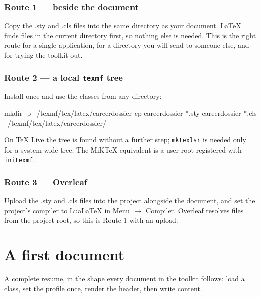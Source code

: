 \documentclass[11pt]{article}
\makeatletter
\newif\ifcd@firstchar
\newcommand{\cd@breaklong}[1]{%
  \cd@firstchartrue
  \@tfor\cd@char:=#1\do{\expandafter\cd@testchar\cd@char}}
\newcommand{\cd@testchar}[1]{%
  \ifcd@firstchar
    \cd@firstcharfalse
  \else
    \ifnum\uccode`#1=`#1 \allowbreak\fi
  \fi
  #1%
  \ifnum0\if#1-1\fi\if#1/1\fi\if#1.1\fi>0 \allowbreak\fi}
\DeclareRobustCommand{\file}[1]{\texttt{\cd@breaklong{#1}}}
\def\file#1{#1}%
\makeatother
\begin{document}
\subsubsection*{Route 1 --- beside the document}

Copy the \file{.sty} and \file{.cls} files into the same directory as your
document. \LaTeX{} finds files in the current directory first, so nothing else
is needed. This is the right route for a single application, for a directory you
will send to someone else, and for trying the toolkit out.

\subsubsection*{Route 2 --- a local \texttt{texmf} tree}

Install once and use the classes from any directory:

\begin{plaincode}
mkdir -p ~/texmf/tex/latex/careerdossier
cp careerdossier-*.sty careerdossier-*.cls ~/texmf/tex/latex/careerdossier/
\end{plaincode}

On \TeX{} Live the tree is found without a further step; \texttt{mktexlsr} is
needed only for a system-wide tree. The MiK\TeX{} equivalent is a user root
registered with \texttt{initexmf}.

\subsubsection*{Route 3 --- Overleaf}

Upload the \file{.sty} and \file{.cls} files into the project alongside the
document, and set the project's compiler to LuaLaTeX in
\textsf{Menu $\rightarrow$ Compiler}. Overleaf resolves files from the project
root, so this is Route 1 with an upload.

\section{A first document}
\label{sec:first}

A complete resume, in the shape every document in the toolkit follows: load a
class, set the profile once, render the header, then write content.
\end{document}
